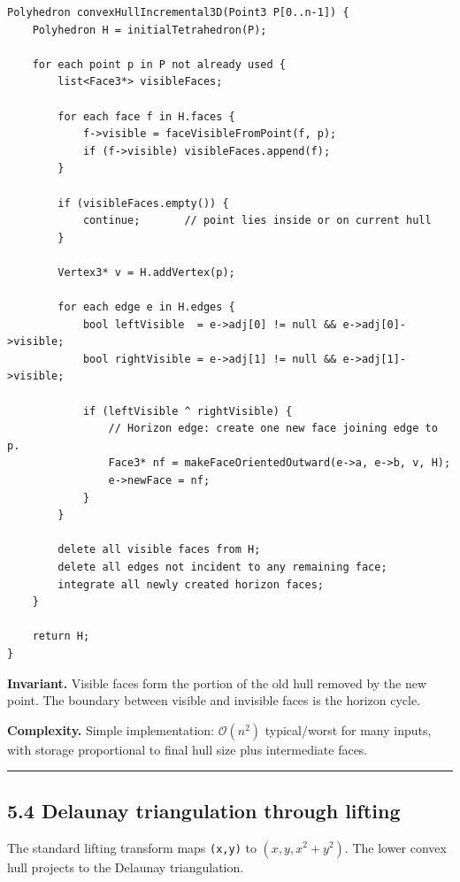 \documentclass[11pt]{article}
\begin{document}
\begin{verbatim}
Polyhedron convexHullIncremental3D(Point3 P[0..n-1]) {
    Polyhedron H = initialTetrahedron(P);

    for each point p in P not already used {
        list<Face3*> visibleFaces;

        for each face f in H.faces {
            f->visible = faceVisibleFromPoint(f, p);
            if (f->visible) visibleFaces.append(f);
        }

        if (visibleFaces.empty()) {
            continue;       // point lies inside or on current hull
        }

        Vertex3* v = H.addVertex(p);

        for each edge e in H.edges {
            bool leftVisible  = e->adj[0] != null && e->adj[0]->visible;
            bool rightVisible = e->adj[1] != null && e->adj[1]->visible;

            if (leftVisible ^ rightVisible) {
                // Horizon edge: create one new face joining edge to p.
                Face3* nf = makeFaceOrientedOutward(e->a, e->b, v, H);
                e->newFace = nf;
            }
        }

        delete all visible faces from H;
        delete all edges not incident to any remaining face;
        integrate all newly created horizon faces;
    }

    return H;
}
\end{verbatim}

\textbf{Invariant.} Visible faces form the portion of the old hull
removed by the new point. The boundary between visible and invisible
faces is the horizon cycle.

\textbf{Complexity.} Simple implementation:
\(\mathcal{O}(n^2)\) typical/worst for many inputs, with
storage proportional to final hull size plus intermediate faces.

\begin{center}\rule{0.5\linewidth}{0.5pt}\end{center}

\subsection{5.4 Delaunay triangulation through
lifting}\label{delaunay-triangulation-through-lifting}

The standard lifting transform maps \texttt{(x,y)} to
\(\left(x, y, x^2+y^2\right)\). The lower convex hull
projects to the Delaunay triangulation.
\end{document}
